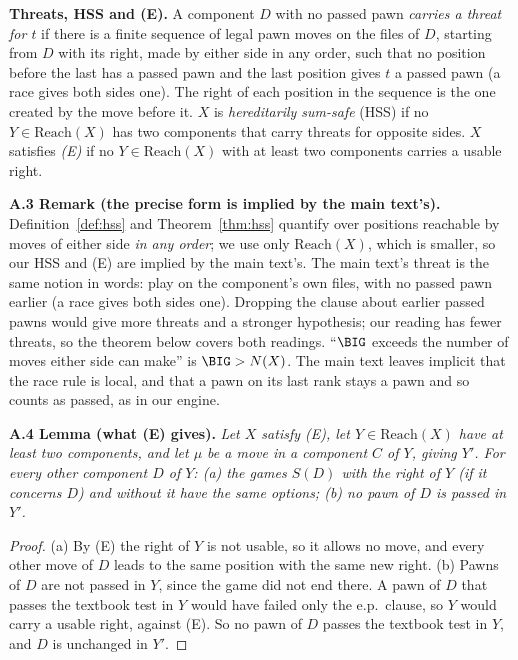 \textbf{Threats, HSS and (E).} A component $D$ with no passed pawn \emph{carries a threat for $t$} if there is a finite
sequence of legal pawn moves on the files of $D$, starting from $D$ with its right, made by either side in any order, such
that no position before the last has a passed pawn and the last position gives $t$ a passed pawn (a race gives both sides
one). The right of each position in the sequence is the one created by the move before it.
$X$ is \emph{hereditarily sum-safe} (HSS) if no $Y\in\mathrm{Reach}(X)$ has two components that carry threats for opposite
sides. $X$ satisfies \emph{(E)} if no $Y\in\mathrm{Reach}(X)$ with at least two components carries a usable right.

\textbf{A.3 Remark (the precise form is implied by the main text's).} Definition~\ref{def:hss} and Theorem~\ref{thm:hss}
quantify over positions reachable by moves of either side \emph{in any order}; we use only $\mathrm{Reach}(X)$, which is
smaller, so our HSS and (E) are implied by the main text's. The main text's threat is the same notion in words: play on the component's own files, with no passed
pawn earlier (a race gives both sides one). Dropping the clause about earlier passed pawns would give more threats and a stronger
hypothesis; our reading has fewer threats, so the theorem below covers both readings. ``$\BIG$ exceeds the number of moves either side can make'' is $\BIG>N(X)$. The main
text leaves implicit that the race rule is local, and that a pawn on its last rank stays a pawn and so counts as passed, as in our engine.

\textbf{A.4 Lemma (what (E) gives).} \emph{Let $X$ satisfy (E), let $Y\in\mathrm{Reach}(X)$ have at least two components,
and let $\mu$ be a move in a component $C$ of $Y$, giving $Y'$. For every other component $D$ of $Y$: (a) the games
$S(D)$ with the right of $Y$ (if it concerns $D$) and without it have the same options; (b) no pawn of $D$ is passed in
$Y'$.}

\begin{proof}
(a) By (E) the right of $Y$ is not usable, so it allows no move, and every other move of $D$ leads to the same position
with the same new right. (b) Pawns of $D$ are not passed in $Y$, since the game did not end there. A pawn of $D$ that
passes the textbook test in $Y$ would have failed only the e.p.\ clause, so $Y$ would carry a usable right, against (E). So
no pawn of $D$ passes the textbook test in $Y$, and $D$ is unchanged in $Y'$.
\end{proof}

